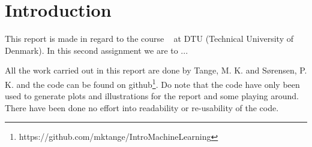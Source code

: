 \chapter{Introduction}
This report is made in regard to the course \textsf{\courseno\ \coursename} at DTU (Technical University of Denmark). In this second assignment we are to ...


All the work carried out in this report are done by Tange, M. K. and Sørensen, P. K. and the code can be found on github\footnote{https://github.com/mktange/IntroMachineLearning}. Do note that the code have only been used to generate plots and illustrations for the report and some playing around. There have been done no effort into readability or re-usability of the code.